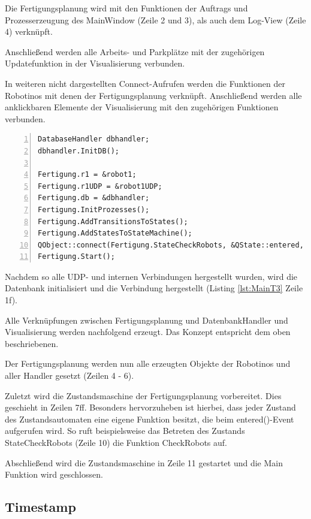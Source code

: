 Die Fertigungsplanung wird mit den Funktionen der Auftrags und Prozesserzeugung des MainWindow (Zeile 2 und 3), als auch dem Log-View (Zeile 4) verknüpft. 

Anschließend werden alle Arbeits- und Parkplätze mit der zugehörigen Updatefunktion in der Visualisierung verbunden.

In weiteren nicht dargestellten Connect-Aufrufen werden die Funktionen der Robotinos mit denen der Fertigungsplanung verknüpft. Anschließend werden alle anklickbaren Elemente der Visualisierung mit den zugehörigen Funktionen verbunden. 

\begin{lstlisting}[frame=single, breaklines=true, numbers=left, stepnumber=1, firstnumber=1, numberstyle = \tiny, caption=Main Funktion Teil 3 - Datenbank und StateMachine,label=lst:MainT3]
DatabaseHandler dbhandler;
dbhandler.InitDB();

Fertigung.r1 = &robot1;
Fertigung.r1UDP = &robot1UDP;
Fertigung.db = &dbhandler;
Fertigung.InitProzesses();
Fertigung.AddTransitionsToStates();
Fertigung.AddStatesToStateMachine();
QObject::connect(Fertigung.StateCheckRobots, &QState::entered, &Fertigung, &Fertigungsplanung::CheckRobots);
Fertigung.Start();
\end{lstlisting}

Nachdem so alle UDP- und internen Verbindungen hergestellt wurden, wird die Datenbank initialisiert und die Verbindung hergestellt (Listing \ref{lst:MainT3} Zeile 1f). 

Alle Verknüpfungen zwischen Fertigungsplanung und DatenbankHandler und Visualisierung werden nachfolgend erzeugt. Das Konzept entspricht dem oben beschriebenen. 

Der Fertigungsplanung werden nun alle erzeugten Objekte der Robotinos und aller Handler gesetzt (Zeilen 4 - 6). 

Zuletzt wird die Zustandsmaschine der Fertigungsplanung vorbereitet. Dies geschieht in Zeilen 7ff. Besonders hervorzuheben ist hierbei, dass jeder Zustand des Zustandsautomaten eine eigene Funktion besitzt, die beim entered()-Event aufgerufen wird. So ruft beispielsweise das Betreten des Zustands StateCheckRobots (Zeile 10) die Funktion CheckRobots auf. 

Abschließend wird die Zustandsmaschine in Zeile 11 gestartet und die Main Funktion wird geschlossen. 

\subsection{Timestamp}

